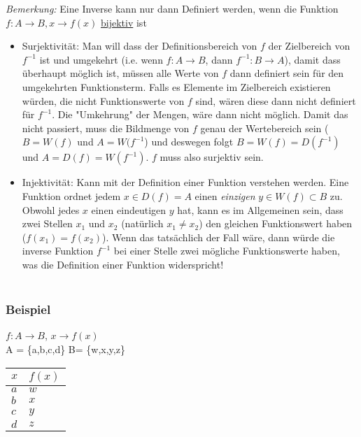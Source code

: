 \documentclass[11pt]{article} %
\begin{document}
\emph{Bemerkung:} Eine Inverse kann nur dann Definiert werden, wenn die Funktion $f: A \rightarrow B, x \rightarrow f(x)$ \underline{bijektiv} ist 
\begin{itemize}
\item Surjektivität: Man will dass der Definitionsbereich von $f$ der Zielbereich von $f^{-1}$ ist und umgekehrt (i.e. wenn $f: A \rightarrow B$, dann $f^{-1}:B \rightarrow A$), damit dass überhaupt möglich ist, müssen alle Werte von $f$ dann definiert sein für den umgekehrten Funktionsterm. Falls es Elemente im Zielbereich existieren würden, die nicht Funktionswerte von $f$ sind, wären diese dann nicht definiert für $f^{-1}$. Die "Umkehrung" der Mengen, wäre dann nicht möglich. Damit das nicht passiert, muss die Bildmenge von $f$ genau der Wertebereich sein ($B = W(f)$ und $A = W(f^{-1}$) und deswegen folgt $ B = W(f) = D(f^{-1})$ und $A = D(f)=W(f^{-1})$. $f$ muss also surjektiv sein.
\item Injektivität: Kann mit der Definition einer Funktion verstehen werden. Eine Funktion ordnet jedem $x \in D(f) = A$ einen \emph{einzigen} $y \in W(f) \subset B$ zu. Obwohl jedes $x$ einen eindeutigen $y$ hat, kann es im Allgemeinen sein, dass zwei Stellen $x_1$ und $x_2$ (natürlich $x_1 \neq x_2$) den gleichen Funktionswert haben ($f(x_1)=f(x_2)$). Wenn das tatsächlich der Fall wäre, dann würde die inverse Funktion $f^{-1}$ bei einer Stelle zwei mögliche Funktionswerte haben, was die Definition einer Funktion widerspricht!\\\\
\end{itemize} 

\subsubsection{Beispiel}

$f: A \rightarrow B$, $x \rightarrow f(x)$\\
A = \{a,b,c,d\}
B= \{w,x,y,z\}

\begin{table}[h!]
    \begin{tabular}{|l|l|}
        \hline
        $x$ & $f(x)$ \\ \hline
        $a$ & $w$    \\ 
        $b$ & $x$    \\ 
        $c$ & $y$    \\ 
        $d$ & $z$    \\
        \hline
    \end{tabular}
\end{table}
\end{document}
